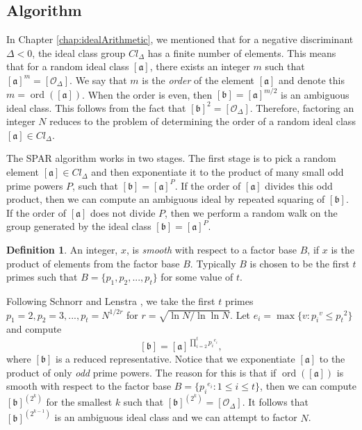 \documentclass{ucalgthes1}
\theoremstyle{plain}
\theoremstyle{definition}
\newtheorem{defn}[thm]{Definition}
\DeclareMathOperator{\ord}{ord}
\begin{document}
\subsection{Algorithm}
\newcommand{\aclass}{[\mathfrak a]}
\newcommand{\bclass}{[\mathfrak b]}
\newcommand{\cclass}{[\mathfrak c]}
\newcommand{\dclass}{[\mathfrak d]}
\newcommand{\idclass}{[\mathcal O_\Delta]}

In Chapter \ref{chap:idealArithmetic}, we mentioned that for a negative discriminant $\Delta < 0$, the ideal class group $Cl_\Delta$ has a finite number of elements.  This means that for a random ideal class $\aclass$, there exists an integer $m$ such that $\aclass^m = \idclass$. We say that $m$ is the \emph{order} of the element $\aclass$ and denote this $m = \ord(\aclass)$.  When the order is even, then $\bclass = \aclass^{m/2}$ is an ambiguous ideal class.  This follows from the fact that $\bclass^2 = \idclass$.  Therefore, factoring an integer $N$ reduces to the problem of determining the order of a random ideal class $\aclass \in Cl_\Delta$.

The SPAR algorithm works in two stages. The first stage is to pick a random element $\aclass \in Cl_\Delta$ and then exponentiate it to the product of many small odd prime powers $P$, such that $\bclass = \aclass^P$.  If the order of $\aclass$ divides this odd product, then we can compute an ambiguous ideal by repeated squaring of $\bclass$.  If the order of $\aclass$ does not divide $P$, then we perform a random walk on the group generated by the ideal class $\bclass = \aclass^P$.

\begin{defn}
An integer, $x$, is \emph{smooth} with respect to a factor base $B$, if $x$ is the product of elements from the factor base $B$.  Typically $B$ is chosen to be the first $t$ primes such that $B = \{p_1, p_2, ..., p_t\}$ for some value of $t$.
\end{defn}

Following Schnorr and Lenstra \cite{Schnorr1984}, we take the first $t$ primes $p_1 = 2, p_2 = 3, ..., p_t = N^{1/2r}$ for $r = \sqrt{\ln N / \ln \ln N}$.  Let $e_i = \max \{ v : {p_i}^v \le {p_t}^2 \}$ and compute
\[
	\bclass = \aclass^{\prod_{i=2}^t {p_i}^{e_i}},
\]
where $\bclass$ is a reduced representative. Notice that we exponentiate $\aclass$ to the product of only \emph{odd} prime powers.  The reason for this is that if $\ord(\aclass)$ is smooth with respect to the factor base $B = \{{p_i}^{e_i} : 1 \le i \le t\}$, then we can compute $\bclass^{\left(2^k\right)}$ for the smallest $k$ such that $\bclass^{\left(2^k\right)} = \idclass$.  It follows that $\bclass^{\left(2^{k-1}\right)}$ is an ambiguous ideal class and we can attempt to factor $N$.
\end{document}
